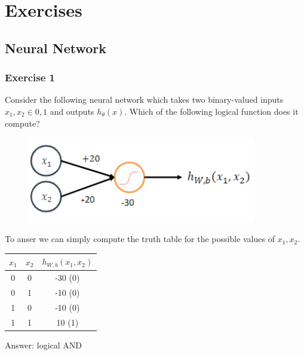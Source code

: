 \section{Exercises}
\renewcommand{\arraystretch}{1.5}
\subsection*{Neural Network}
\subsubsection*{Exercise 1}
Consider the following neural network which takes two binary-valued inputs $x_1,x_2 \in {0,1}$ and outputs $h_\theta(x)$. Which of the following logical function does it compute?
\begin{figure}[htbp]
    \centering
    \includegraphics[width=10cm]{ExerciseBook/01-NeuralNetwork/exercise1.png}\newline
\end{figure}\newline
To anser we can simply compute the truth table for the possible values of $x_1, x_2$.
\begin{center}
    
    \begin{tabular}{ |c |c |c |}
        \hline
        \textbf{$x_1$} & \textbf{$x_2$} & \textbf{$h_{W,b}(x_1,x_2)$} \\
        \hline
        0 & 0 & -30 (0) \\ 
        0 & 1 & -10 (0) \\  
        1 & 0 & -10 (0) \\
        1 & 1 & 10 (1)\\
        \hline
    \end{tabular}
    Answer: logical AND
\end{center}
